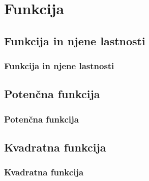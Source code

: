 \section{Funkcija}

\begin{frame}
    \sectionpage
\end{frame}

\begin{frame}
\end{frame}

    \subsection{Funkcija in njene lastnosti}

        \begin{frame}
            \frametitle{Funkcija in njene lastnosti}
        \end{frame}

    \subsection{Potenčna funkcija}

        \begin{frame}
            \frametitle{Potenčna funkcija}
        \end{frame}

    \subsection{Kvadratna funkcija}

        \begin{frame}
            \frametitle{Kvadratna funkcija}
        \end{frame}

